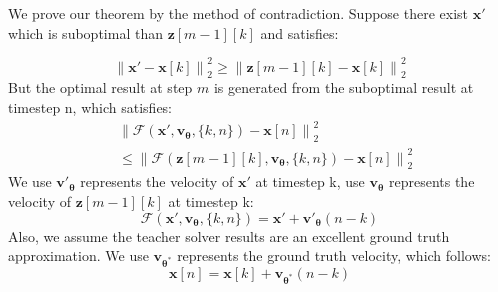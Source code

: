 \documentclass[10pt,twocolumn,letterpaper]{article}
\newcommand{\norm}[1]{\left\lVert#1\right\rVert}
\begin{document}
    We prove our theorem by the method of contradiction. Suppose there exist $\bm{x'}$ which is suboptimal than $\bm{z}[m-1][k]$ and satisfies:

    \begin{equation}
        \norm{\bm{x'} - \bm{x}[k]}^2_2 \ge \norm{\bm{z}[m-1][k] - \bm{x}[k]}^2_2
    \end{equation}
    But the optimal result at step $m$ is generated from the suboptimal result at timestep n, which satisfies:
    \begin{align} \label{Eq:target}
        & \norm{\mathcal{F}(\bm{x'}, \bm{v_\theta},\{k,n\}) - \bm{x}[n]}^2_2 \\
        & \leq \norm{\mathcal{F}(\bm{z}[m-1][k], \bm{v_\theta}, \{k,n\}) - \bm{x}[n]}^2_2 
    \end{align}
    We use $\bm{v'_{\theta}}$ represents the velocity of $\bm{x'}$ at timestep k, use  $\bm{v_{\theta}}$ represents the velocity of $\bm{z}[m-1][k]$ at timestep k:
    \begin{equation}
        \mathcal{F}(\bm{x'}, \bm{v_\theta},\{k,n\}) = \bm{x'} + \bm{v'_{\theta}}(n-k)
    \end{equation}
    Also, we assume the teacher solver results are an excellent ground truth approximation. We use $\bm{v_{\theta^*}}$ represents the ground truth velocity, which follows:
    \begin{equation}
        \bm{x}[n] = \bm{x}[k] + \bm{v_{\theta^*}}(n-k)
    \end{equation}

    
\end{document}

